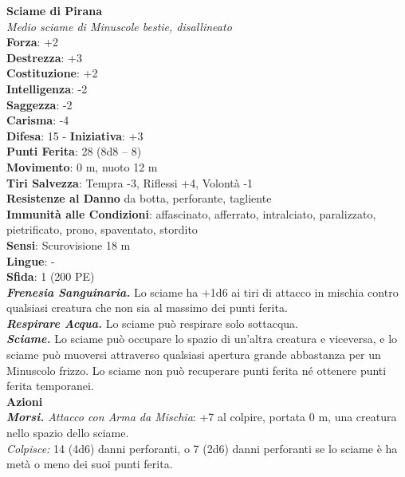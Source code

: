 \begin{multicols}{2}
\medskip\textbf{Sciame di Pirana}\\
\emph{Medio sciame di Minuscole bestie, disallineato}\\
\textbf{Forza}: +2\\
\textbf{Destrezza}: +3\\
\textbf{Costituzione}: +2\\
\textbf{Intelligenza}: -2\\
\textbf{Saggezza}: -2\\
\textbf{Carisma}: -4\\
\textbf{Difesa}: 15 - \textbf{Iniziativa}: +3\\
\textbf{Punti Ferita}: 28 (8d8 -- 8)\\
\textbf{Movimento}: 0 m, nuoto 12 m\\
\textbf{Tiri Salvezza}: Tempra -3, Riflessi +4, Volontà -1\\
\textbf{Resistenze al Danno} da botta, perforante, tagliente\\
\textbf{Immunità alle Condizioni}: affascinato, afferrato, intralciato, paralizzato, pietrificato, prono, spaventato, stordito\\
\textbf{Sensi}: Scurovisione 18 m\\
\textbf{Lingue}: -\\
\textbf{Sfida}: 1 (200 PE)\smallskip\\
\emph{\textbf{Frenesia Sanguinaria.}} Lo sciame ha +1d6 ai tiri di attacco in mischia contro qualsiasi creatura che non sia al massimo dei punti ferita.\\
\emph{\textbf{Respirare Acqua.}} Lo sciame può respirare solo sottacqua.\\
\emph{\textbf{Sciame.}} Lo sciame può occupare lo spazio di un'altra creatura e viceversa, e lo sciame può muoversi attraverso qualsiasi apertura grande abbastanza per un Minuscolo frizzo. Lo sciame non può recuperare punti ferita né ottenere punti ferita temporanei.\\
\smallskip\textbf{Azioni}\\
\emph{\textbf{Morsi.} Attacco con Arma da Mischia}: +7 al colpire, portata 0 m, una creatura nello spazio dello sciame.\\
\emph{Colpisce:} 14 (4d6) danni perforanti, o 7 (2d6) danni perforanti se lo sciame è ha metà o meno dei suoi punti ferita.\\


\end{multicols}
